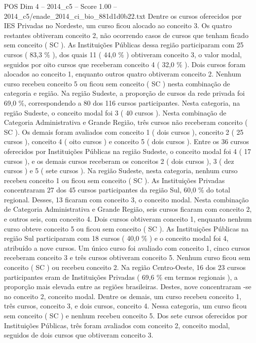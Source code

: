 \begin{textsample}{POS Dim 4 – 2014\_c5 – Score 1.00 – 2014\_c5/enade\_2014\_ci\_bio\_881d1d0b22.txt}
Dentre os cursos oferecidos por IES Privadas no Nordeste, um curso ficou alocado ao conceito 3.
Os quatro restantes obtiveram conceito 2, não ocorrendo casos de cursos que tenham ficado sem conceito ( SC ).
As Instituições Públicas dessa região participaram com 25 cursos ( 83,3 \% ), dos quais 11 ( 44,0 \% ) obtiveram conceito 3, o valor modal, seguidos por oito cursos que receberam conceito 4 ( 32,0 \% ).
Dois cursos foram alocados ao conceito 1, enquanto outros quatro obtiveram conceito 2.
Nenhum curso recebeu conceito 5 ou ficou sem conceito ( SC ) nesta combinação de categoria e região.
Na região Sudeste, a proporção de cursos da rede privada foi 69,0 \%, correspondendo a 80 dos 116 cursos participantes.
Nesta categoria, na região Sudeste, o conceito modal foi 3 ( 40 cursos ).
Nesta combinação de Categoria Administrativa e Grande Região, três cursos não receberam conceito ( SC ).
Os demais foram avaliados com conceito 1 ( dois cursos ), conceito 2 ( 25 cursos ), conceito 4 ( oito cursos ) e conceito 5 ( dois cursos ).
Entre os 36 cursos oferecidos por Instituições Públicas na região Sudeste, o conceito modal foi 4 ( 17 cursos ), e os demais cursos receberam os conceitos 2 ( dois cursos ), 3 ( dez cursos ) e 5 ( sete cursos ).
Na região Sudeste, nesta categoria, nenhum curso recebeu conceito 1 ou ficou sem conceito ( SC ).
As Instituições Privadas concentraram 27 dos 45 cursos participantes da região Sul, 60,0 \% do total regional.
Desses, 13 ficaram com conceito 3, o conceito modal.
Nesta combinação de Categoria Administrativa e Grande Região, seis cursos ficaram com conceito 2, e outros seis, com conceito 4.
Dois cursos obtiveram conceito 1, enquanto nenhum curso obteve conceito 5 ou ficou sem conceito ( SC ).
As Instituições Públicas na região Sul participaram com 18 cursos ( 40,0 \% ) e o conceito modal foi 4, atribuído a nove cursos.
Um único curso foi avaliado com conceito 1, cinco cursos receberam conceito 3 e três cursos obtiveram conceito 5.
Nenhum curso ficou sem conceito ( SC ) ou recebeu conceito 2.
Na região Centro-Oeste, 16 dos 23 cursos participantes eram de Instituições Privadas ( 69,6 \% em termos regionais ), a proporção mais elevada entre as regiões brasileiras.
Destes, nove concentraram -se no conceito 2, conceito modal.
Dentre os demais, um curso recebeu conceito 1, três cursos, conceito 3, e dois cursos, conceito 4.
Nessa categoria, um curso ficou sem conceito ( SC ) e nenhum recebeu conceito 5.
Dos sete cursos oferecidos por Instituições Públicas, três foram avaliados com conceito 2, conceito modal, seguidos de dois cursos que obtiveram conceito 3.

\end{textsample}
